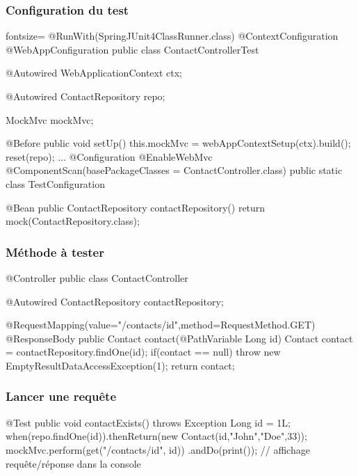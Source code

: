\begin{frame}[fragile]
 \frametitle{Configuration du test}
 
 \begin{javacode*}{fontsize=\tiny}
@RunWith(SpringJUnit4ClassRunner.class)
@ContextConfiguration
@WebAppConfiguration
public class ContactControllerTest {

    @Autowired WebApplicationContext ctx;

    @Autowired ContactRepository repo;

    MockMvc mockMvc;

    @Before public void setUp() {
        this.mockMvc = webAppContextSetup(ctx).build();
        reset(repo);
    }
    ...
    @Configuration
    @EnableWebMvc
    @ComponentScan(basePackageClasses = ContactController.class)
    public static class TestConfiguration {

        @Bean
        public ContactRepository contactRepository() {
            return mock(ContactRepository.class);
        }

    }
}   
 \end{javacode*}
 
\end{frame}


\begin{frame}[fragile]
 \frametitle{Méthode à tester}
 
 \begin{javacode}
@Controller
public class ContactController {

  @Autowired ContactRepository contactRepository;

  @RequestMapping(value="/contacts/{id}",method=RequestMethod.GET)
  @ResponseBody
  public Contact contact(@PathVariable Long id) {		
    Contact contact = contactRepository.findOne(id);
    if(contact == null) {
      throw new EmptyResultDataAccessException(1);
    }
    return contact;
  }
  
}
 \end{javacode}

 
\end{frame}

\begin{frame}[fragile]
 \frametitle{Lancer une requête}
 
 \begin{javacode}
@Test
public void contactExists() throws Exception {
    Long id = 1L;
    when(repo.findOne(id)).thenReturn(new Contact(id,"John","Doe",33));
    mockMvc.perform(get("/contacts/{id}", id))
         .andDo(print()); // affichage requ\^ete/r\'eponse dans la console
}
 \end{javacode}

\end{frame}

